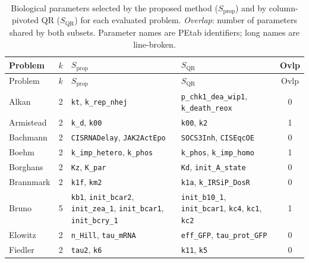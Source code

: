 {\scriptsize
\begin{longtable}{@{}>{\raggedright\arraybackslash}p{2.3cm}r>{\raggedright\arraybackslash}p{4.0cm}>{\raggedright\arraybackslash}p{4.0cm}c@{}}
\caption{Biological parameters selected by the proposed method ($S_{\mathrm{prop}}$) and by column-pivoted QR ($S_{\mathrm{QR}}$) for each evaluated problem. \emph{Overlap}: number of parameters shared by both subsets. Parameter names are PEtab identifiers; long names are line-broken.}\label{tab:brun_params}\\
\toprule
Problem & $k$ & $S_{\mathrm{prop}}$ & $S_{\mathrm{QR}}$ & Ovlp \\
\midrule \endfirsthead
\toprule Problem & $k$ & $S_{\mathrm{prop}}$ & $S_{\mathrm{QR}}$ & Ovlp \\ \midrule \endhead
Alkan & 2
  & \texttt{kt}, \texttt{k\_\allowbreak{}rep\_\allowbreak{}nhej}
  & \texttt{p\_\allowbreak{}chk1\_\allowbreak{}dea\_\allowbreak{}wip1}, \texttt{k\_\allowbreak{}death\_\allowbreak{}reox}
  & 0 \\
Armistead & 2
  & \texttt{k\_\allowbreak{}d}, \texttt{k00}
  & \texttt{k00}, \texttt{k2}
  & 1 \\
Bachmann & 2
  & \texttt{CISRNADelay}, \texttt{JAK2ActEpo}
  & \texttt{SOCS3Inh}, \texttt{CISEqcOE}
  & 0 \\
Boehm & 2
  & \texttt{k\_\allowbreak{}imp\_\allowbreak{}hetero}, \texttt{k\_\allowbreak{}phos}
  & \texttt{k\_\allowbreak{}phos}, \texttt{k\_\allowbreak{}imp\_\allowbreak{}homo}
  & 1 \\
Borghans & 2
  & \texttt{Kz}, \texttt{K\_\allowbreak{}par}
  & \texttt{Kd}, \texttt{init\_\allowbreak{}A\_\allowbreak{}state}
  & 0 \\
Brannmark & 2
  & \texttt{k1f}, \texttt{km2}
  & \texttt{k1a}, \texttt{k\_\allowbreak{}IRSiP\_\allowbreak{}DosR}
  & 0 \\
Bruno & 5
  & \texttt{kb1}, \texttt{init\_\allowbreak{}bcar2}, \texttt{init\_\allowbreak{}zea\_\allowbreak{}1}, \texttt{init\_\allowbreak{}bcar1}, \texttt{init\_\allowbreak{}bcry\_\allowbreak{}1}
  & \texttt{init\_\allowbreak{}b10\_\allowbreak{}1}, \texttt{init\_\allowbreak{}bcar1}, \texttt{kc4}, \texttt{kc1}, \texttt{kc2}
  & 1 \\
Elowitz & 2
  & \texttt{n\_\allowbreak{}Hill}, \texttt{tau\_\allowbreak{}mRNA}
  & \texttt{eff\_\allowbreak{}GFP}, \texttt{tau\_\allowbreak{}prot\_\allowbreak{}GFP}
  & 0 \\
Fiedler & 2
  & \texttt{tau2}, \texttt{k6}
  & \texttt{k11}, \texttt{k5}
  & 0 \\

\end{longtable}}
